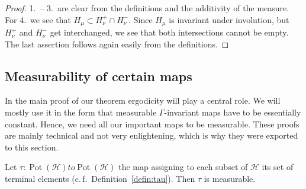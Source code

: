 \begin{proof}
  1.\ -- 3.\ are clear from the definitions and the additivity of the measure. For 4.\ we see that \(H_\mu \subset H_\nu^+ \cap H_\nu^-\). Since \(H_\mu\) is invariant under involution, but \(H_\nu^+\) and \(H_\nu^-\) get interchanged, we see that both intersections cannot be empty. The last assertion follows again easily from the definitions.
\end{proof}


\subsection{Measurability of certain maps}
\label{sec:meas-maps}

In the main proof of our theorem ergodicity will play a central role. We will mostly use it in the form that measurable \(\Gamma\)-invariant maps have to be essentially constant. Hence, we need all our important maps to be measurable. These proofs are mainly technical and not very enlightening, which is why they were exported to this section.

\begin{lemma}
  \label{lem:tau}
   Let \(\tau\colon \operatorname{Pot}(\mathcal{H}) to \operatorname{Pot}(\mathcal{H})\) the map assigning to each subset of \(\mathcal{H}\) its set of terminal elements (c.\,f.~Definition~\ref{defin:tau}). Then \(\tau\) is measurable.
\end{lemma}

